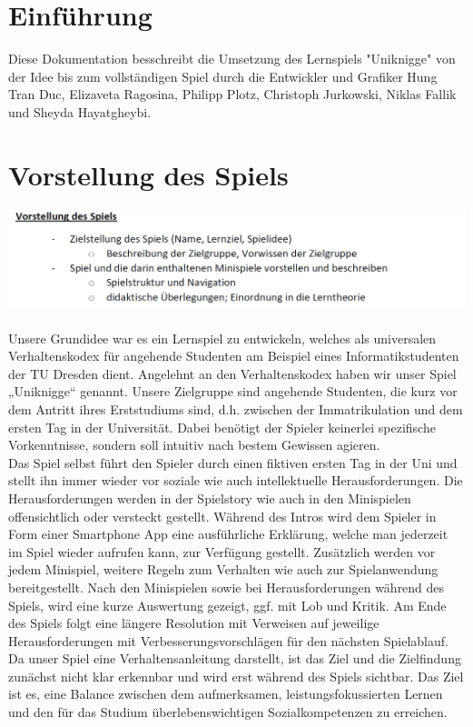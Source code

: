 \documentclass[a4paper, 11pt]{article} %
\begin{document}
\newpage
\renewcommand{\contentsname}{Inhaltsverzeichnis}
\tableofcontents

\newpage
\section{Einführung}
Diese Dokumentation besschreibt die Umsetzung des Lernspiels "Uniknigge" von der Idee bis zum vollständigen Spiel durch die Entwickler und Grafiker Hung Tran Duc, Elizaveta Ragosina, Philipp Plotz, Christoph Jurkowski, Niklas Fallik und Sheyda Hayatgheybi.

\section{Vorstellung des Spiels}
\includegraphics[scale=0.5]{images/vorstellung.png}\\\\
Unsere Grundidee war es ein Lernspiel zu entwickeln, welches als universalen Verhaltenskodex für angehende Studenten am Beispiel eines Informatikstudenten der TU Dresden dient. Angelehnt an den Verhaltenskodex haben wir unser Spiel „Uniknigge“ genannt. Unsere Zielgruppe sind angehende Studenten, die kurz vor dem Antritt ihres Erststudiums sind, d.h. zwischen der Immatrikulation und dem ersten Tag in der Universität. Dabei benötigt der Spieler keinerlei spezifische Vorkenntnisse, sondern soll intuitiv nach bestem Gewissen agieren. \\

Das Spiel selbst führt den Spieler durch einen fiktiven ersten Tag in der Uni und stellt ihn immer wieder vor soziale wie auch intellektuelle Herausforderungen. Die Herausforderungen werden in der Spielstory wie auch in den Minispielen offensichtlich oder versteckt gestellt. Während des Intros wird dem Spieler in Form einer Smartphone App eine ausführliche Erklärung, welche man jederzeit im Spiel wieder aufrufen kann, zur Verfügung gestellt. Zusätzlich werden vor jedem Minispiel, weitere Regeln zum Verhalten wie auch zur Spielanwendung bereitgestellt. Nach den Minispielen sowie bei Herausforderungen während des Spiels, wird eine kurze Auswertung gezeigt, ggf. mit Lob und Kritik. Am Ende des Spiels folgt eine längere Resolution mit Verweisen auf jeweilige Herausforderungen mit Verbesserungsvorschlägen für den nächsten Spielablauf. Da unser Spiel eine Verhaltensanleitung darstellt, ist das Ziel und die Zielfindung zunächst nicht klar erkennbar und wird erst während des Spiels sichtbar.
Das Ziel ist es, eine Balance zwischen dem aufmerksamen, leistungsfokussierten Lernen und den für das Studium überlebenswichtigen Sozialkompetenzen zu erreichen.
\end{document}
